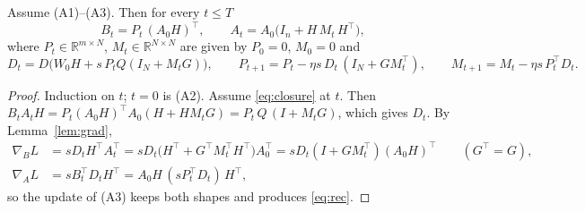 \begin{theorem}\label{thm:traj}
Assume (A1)--(A3). Then for every $t\le T$
\begin{equation}\label{eq:closure}
  B_t=P_t\,(A_0H)^{\!\top},\qquad A_t=A_0\bigl(I_n+H\,M_t\,H^{\!\top}\bigr),
\end{equation}
where $P_t\in\mathbb R^{m\times N}$, $M_t\in\mathbb R^{N\times N}$ are given
by $P_0=0$, $M_0=0$ and
\begin{equation}\label{eq:rec}
  D_t=D\bigl(W_0H+s\,P_tQ(I_N+M_tG)\bigr),\qquad
  P_{t+1}=P_t-\eta s\,D_t\,(I_N+GM_t^{\!\top}),\qquad
  M_{t+1}=M_t-\eta s\,P_t^{\!\top}D_t .
\end{equation}
\end{theorem}
\begin{proof}
Induction on $t$; $t=0$ is (A2). Assume \eqref{eq:closure} at $t$. Then
$B_tA_tH=P_t(A_0H)^{\!\top}A_0(H+HM_tG)=P_t\,Q\,(I+M_tG)$, which gives $D_t$.
By Lemma~\ref{lem:grad},
\begin{align*}
  \nabla_BL&=sD_tH^{\!\top}A_t^{\!\top}=sD_t\bigl(H^{\!\top}+G^{\!\top}M_t^{\!\top}H^{\!\top}\bigr)A_0^{\!\top}
  =sD_t(I+GM_t^{\!\top})(A_0H)^{\!\top}\qquad(G^{\!\top}=G),\\
  \nabla_AL&=sB_t^{\!\top}D_tH^{\!\top}=A_0H\,(sP_t^{\!\top}D_t)\,H^{\!\top},
\end{align*}
so the update of (A3) keeps both shapes and produces \eqref{eq:rec}.
\end{proof}

